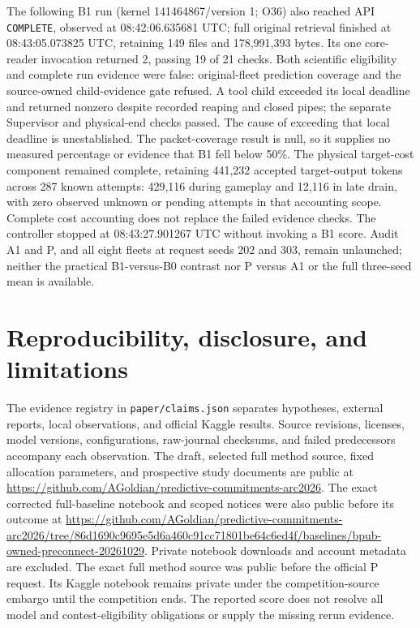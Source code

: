 \documentclass[11pt]{article}
\begin{document}
The following B1 run (kernel 141464867/version 1; O36) also reached API \texttt{COMPLETE}, observed at 08:42:06.635681 UTC; full original retrieval finished at 08:43:05.073825 UTC, retaining 149 files and 178,991,393 bytes. Its one core-reader invocation returned 2, passing 19 of 21 checks. Both scientific eligibility and complete run evidence were false: original-fleet prediction coverage and the source-owned child-evidence gate refused. A tool child exceeded its local deadline and returned nonzero despite recorded reaping and closed pipes; the separate Supervisor and physical-end checks passed. The cause of exceeding that local deadline is unestablished. The packet-coverage result is null, so it supplies no measured percentage or evidence that B1 fell below 50\%. The physical target-cost component remained complete, retaining 441,232 accepted target-output tokens across 287 known attempts: 429,116 during gameplay and 12,116 in late drain, with zero observed unknown or pending attempts in that accounting scope. Complete cost accounting does not replace the failed evidence checks. The controller stopped at 08:43:27.901267 UTC without invoking a B1 score. Audit A1 and P, and all eight fleets at request seeds 202 and 303, remain unlaunched; neither the practical B1-versus-B0 contrast nor P versus A1 or the full three-seed mean is available.

\section{Reproducibility, disclosure, and limitations}
The evidence registry in \texttt{paper/claims.json} separates hypotheses, external reports, local observations, and official Kaggle results. Source revisions, licenses, model versions, configurations, raw-journal checksums, and failed predecessors accompany each observation. The draft, selected full method source, fixed allocation parameters, and prospective study documents are public at \url{https://github.com/AGoldian/predictive-commitments-arc2026}. The exact corrected full-baseline notebook and scoped notices were also public before its outcome at \url{https://github.com/AGoldian/predictive-commitments-arc2026/tree/86d1690c9695e5d6a460c91cc71801be64c6ed4f/baselines/bpub-owned-preconnect-20261029}. Private notebook downloads and account metadata are excluded. The exact full method source was public before the official P request. Its Kaggle notebook remains private under the competition-source embargo until the competition ends. The reported score does not resolve all model and contest-eligibility obligations or supply the missing rerun evidence.
\end{document}
